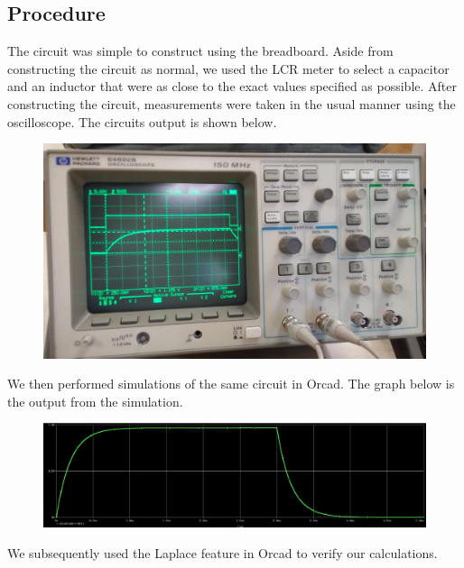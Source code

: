 \documentclass[11pt]{article}
\begin{document}
	\subsection*{Procedure}
	The circuit was simple to construct using the breadboard. Aside from constructing the circuit as normal, we used the LCR meter to select a capacitor and an inductor that were as close to the exact values specified as possible. After constructing the circuit, measurements were taken in the usual manner using the oscilloscope. The circuits output is shown below.
	\begin{figure}[H]
		\centering
		\includegraphics[width=5in]{images/oscilloscope_transfer.jpg}
	\end{figure}
	We then performed simulations of the same circuit in Orcad. The graph below is the output from the simulation.
	\begin{figure}[H]
		\centering
		\includegraphics[width=6in]{images/simulated_curve.png}
	\end{figure}
	
	We subsequently used the Laplace feature in Orcad to verify our calculations. 
	
\end{document}
